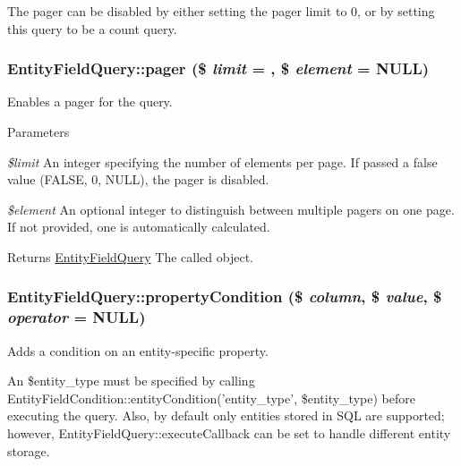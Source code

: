 The pager can be disabled by either setting the pager limit to 0, or by setting this query to be a count query. \hypertarget{classEntityFieldQuery_a31f0215e7fc7a6469e97bfd850430fb7}{
\subsubsection[{pager}]{\setlength{\rightskip}{0pt plus 5cm}EntityFieldQuery::pager (\$ {\em limit} = {}, \/  \$ {\em element} = {\ttfamily NULL})}}
\label{classEntityFieldQuery_a31f0215e7fc7a6469e97bfd850430fb7}
Enables a pager for the query.


\begin{DoxyParams}{Parameters}
\item[{\em \$limit}]An integer specifying the number of elements per page. If passed a false value (FALSE, 0, NULL), the pager is disabled. \item[{\em \$element}]An optional integer to distinguish between multiple pagers on one page. If not provided, one is automatically calculated.\end{DoxyParams}
\begin{DoxyReturn}{Returns}
\hyperlink{classEntityFieldQuery}{EntityFieldQuery} The called object. 
\end{DoxyReturn}
\hypertarget{classEntityFieldQuery_a732e6068c9fdba15a8142cc03328973e}{
\subsubsection[{propertyCondition}]{\setlength{\rightskip}{0pt plus 5cm}EntityFieldQuery::propertyCondition (\$ {\em column}, \/  \$ {\em value}, \/  \$ {\em operator} = {\ttfamily NULL})}}
\label{classEntityFieldQuery_a732e6068c9fdba15a8142cc03328973e}
Adds a condition on an entity-\/specific property.

An \$entity\_\-type must be specified by calling EntityFieldCondition::entityCondition('entity\_\-type', \$entity\_\-type) before executing the query. Also, by default only entities stored in SQL are supported; however, EntityFieldQuery::executeCallback can be set to handle different entity storage.


